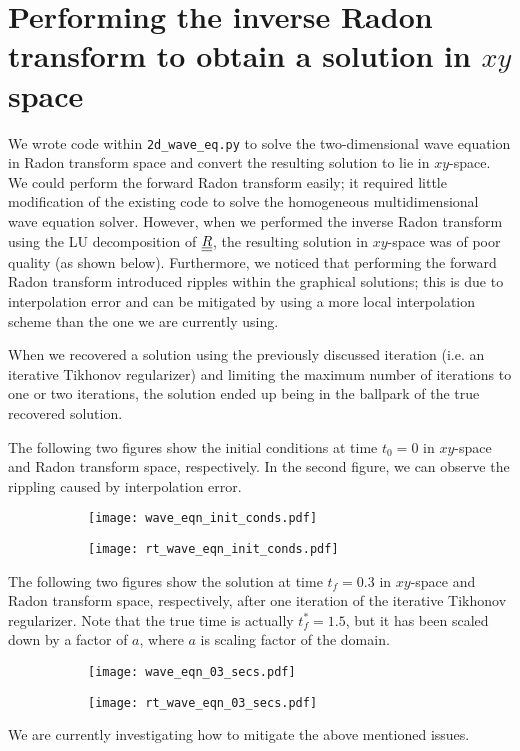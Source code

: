 
\section*{Performing the inverse Radon transform to obtain a solution in $xy$ space}
We wrote code within \verb|2d_wave_eq.py| to solve the two-dimensional wave equation in Radon transform space and convert the resulting solution to lie in $xy$-space.
We could perform the forward Radon transform easily; it required little modification of the existing code to solve the homogeneous multidimensional wave equation solver.
However, when we performed the inverse Radon transform using the LU decomposition of ${\underline{\underline{R}}}$, the resulting solution in $xy$-space was of poor quality (as shown below).
Furthermore, we noticed that performing the forward Radon transform introduced ripples within the graphical solutions; this is due to interpolation error and can be mitigated by using a more local interpolation scheme than the one we are currently using.
\par
When we recovered a solution using the previously discussed iteration (i.e. an iterative Tikhonov regularizer) and limiting the maximum number of iterations to one or two iterations, the solution ended up being in the ballpark of the true recovered solution.
\par
The following two figures show the initial conditions at time $t_{0} = 0$ in $xy$-space and Radon transform space, respectively.
In the second figure, we can observe the rippling caused by interpolation error. 
\begin{figure}[H]
	\centering
	\begin{subfigure}[h]{0.475\textwidth}
		\texttt{[image: wave\_eqn\_init\_conds.pdf]}
	\end{subfigure}
	\begin{subfigure}[h]{0.475\textwidth}
		\texttt{[image: rt\_wave\_eqn\_init\_conds.pdf]}
	\end{subfigure}
\end{figure}
The following two figures show the solution at time $t_{f} = 0.3$ in $xy$-space and Radon transform space, respectively, after one iteration of the iterative Tikhonov regularizer.
Note that the true time is actually $t_{f}^{*} = 1.5$, but it has been scaled down by a factor of $a$, where $a$ is scaling factor of the domain.
\begin{figure}[H]
	\centering
	\begin{subfigure}[h]{0.475\textwidth}
		\texttt{[image: wave\_eqn\_03\_secs.pdf]}
	\end{subfigure}
	\begin{subfigure}[h]{0.475\textwidth}
		\texttt{[image: rt\_wave\_eqn\_03\_secs.pdf]}
	\end{subfigure}
\end{figure}
We are currently investigating how to mitigate the above mentioned issues.